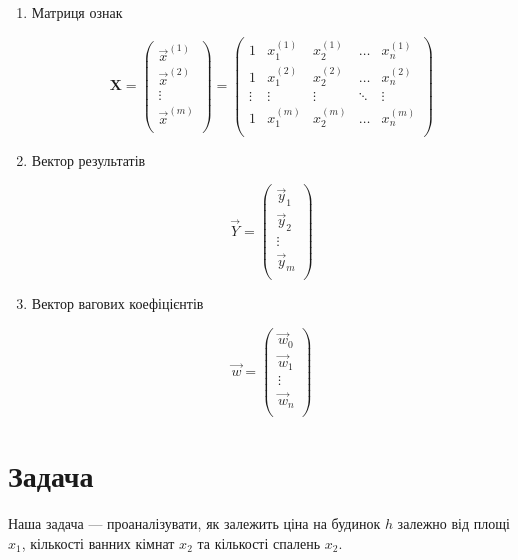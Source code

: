 \documentclass[]{article}
\begin{document}
\begin{enumerate}
	     \item  Матриця ознак


\begin{equation*}
\mathbf{X} =
	\begin{pmatrix}
		\vec{x}^{(1)} \\
		\vec{x}^{(2)} \\
		\vdots        \\
		\vec{x}^{(m)} \\
	\end{pmatrix}
	=
	\begin{pmatrix}
		1      & x_1^{(1)} & x_2^{(1)} & \ldots & x_n^{(1)} \\
		1      & x_1^{(2)} & x_2^{(2)} & \ldots & x_n^{(2)} \\
		\vdots & \vdots    & \vdots    & \ddots & \vdots    \\
		1      & x_1^{(m)} & x_2^{(m)} & \ldots & x_n^{(m)} \\
	\end{pmatrix}
\end{equation*}


	\item Вектор результатів


\[
	\vec{Y} =
	\begin{pmatrix}
		\vec{y}_1 \\
		\vec{y}_2 \\
		\vdots    \\
		\vec{y}_m \\
	\end{pmatrix}
\]

	\item Вектор вагових коефіцієнтів


\[
	\vec{w} =
	\begin{pmatrix}
		\vec{w}_0 \\
		\vec{w}_1 \\
		\vdots    \\
		\vec{w}_n \\
	\end{pmatrix}
\]

\end{enumerate}

\section*{Задача}

Наша задача --- проаналізувати, як залежить ціна на будинок \(h\)
залежно від площі \(x_1\), кількості ванних кімнат \(x_2\) та кількості
спалень \(x_2\).
\end{document}
